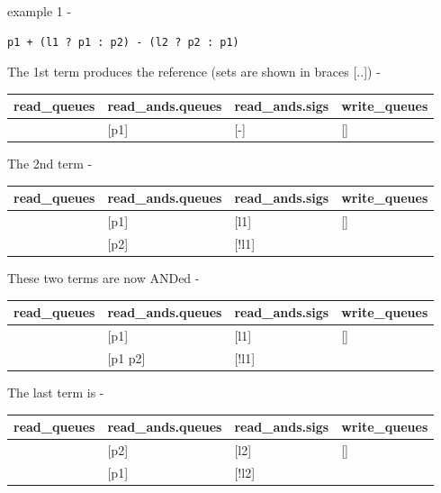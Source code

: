 \documentclass[10pt,a4paper,twoside,fleqn]{book}
\begin{document}
            example 1 -

            \begin{lstlisting}[gobble=12, language=threepl]
                p1 + (l1 ? p1 : p2) - (l2 ? p2 : p1)
            \end{lstlisting}


            The 1st term produces the reference (sets are shown in braces [..]) -

            \begin{tabular}{| l | l | l | l |}
            \hline
            read\_queues  & read\_ands.queues & read\_ands.sigs & write\_queues    \\
            \hline
            [p1]         & [p1]             & [-]             & []              \\
            \hline    
            \end{tabular}

            The 2nd term -

            \begin{tabular}{| l | l | l | l |}
            \hline
            read\_queues  & read\_ands.queues & read\_ands.sigs & write\_queues    \\
            \hline
            [p1 p2]      & [p1]             & [l1]            & []              \\
                         & [p2]             & [!l1]           &                 \\
            \hline        
            \end{tabular}

            These two terms are now ANDed - 

            \begin{tabular}{| l | l | l | l |}
            \hline
            read\_queues  & read\_ands.queues & read\_ands.sigs & write\_queues    \\
            \hline
            [p1 p2]      & [p1]             & [l1]            & []              \\
                         & [p1 p2]          & [!l1]           &                 \\
            \hline        
            \end{tabular}

            The last term is -     

            \begin{tabular}{| l | l | l | l |}
            \hline
            read\_queues  & read\_ands.queues & read\_ands.sigs & write\_queues    \\
            \hline
            [p1 p2]      & [p2]             & [l2]            & []              \\
                         & [p1]             & [!l2]           &                 \\
            \hline        
            \end{tabular}
\end{document}

